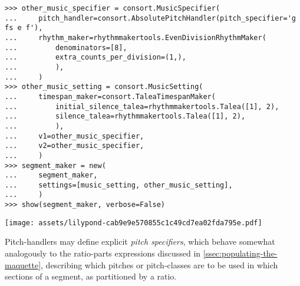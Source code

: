 \begin{abjadbookoutput}
\begin{singlespacing}
\vspace{-0.5\baselineskip}
\begin{verbatim}
>>> other_music_specifier = consort.MusicSpecifier(
...     pitch_handler=consort.AbsolutePitchHandler(pitch_specifier='g fs e f'),
...     rhythm_maker=rhythmmakertools.EvenDivisionRhythmMaker(
...         denominators=[8],
...         extra_counts_per_division=(1,),
...         ),
...     )
>>> other_music_setting = consort.MusicSetting(
...     timespan_maker=consort.TaleaTimespanMaker(
...         initial_silence_talea=rhythmmakertools.Talea([1], 2),
...         silence_talea=rhythmmakertools.Talea([1], 2),
...         ),
...     v1=other_music_specifier,
...     v2=other_music_specifier,
...     )
>>> segment_maker = new(
...     segment_maker,
...     settings=[music_setting, other_music_setting],
...     )
>>> show(segment_maker, verbose=False)
\end{verbatim}
\noindent\texttt{[image: assets/lilypond-cab9e9e570855c1c49cd7ea02fda795e.pdf]}
\end{singlespacing}
\end{abjadbookoutput}

\noindent Pitch-handlers may define explicit \emph{pitch specifiers}, which
behave somewhat analogously to the ratio-parts expressions discussed in
\autoref{ssec:populating-the-maquette}, describing which pitches or
pitch-classes are to be used in which sections of a segment, as partitioned by
a ratio.

\begin{comment}
<abjad>
pitch_specifier = consort.PitchSpecifier(
    pitch_segments=(
        "c' e' g'",
        "fs' g' a'",
        "b d'",
        ),
    ratio=(1, 2, 3),
    )
pitch_choice_timespans = consort.PitchHandler.get_pitch_choice_timespans(
    pitch_specifier=pitch_specifier,
    duration=segment_maker.desired_duration,
    )
print(format(pitch_choice_timespans))
</abjad>
\end{comment}

